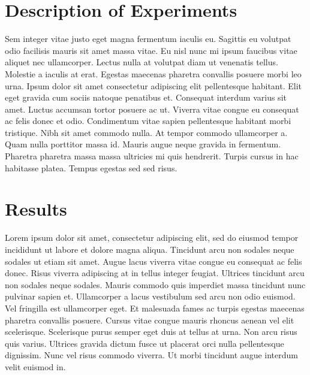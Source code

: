 \documentclass[
]{article}
\begin{document}
\hypertarget{description-of-experiments}{%
\section{Description of Experiments}\label{description-of-experiments}}

Sem integer vitae justo eget magna fermentum iaculis eu. Sagittis eu volutpat odio facilisis mauris sit amet massa vitae. Eu nisl nunc mi ipsum faucibus vitae aliquet nec ullamcorper. Lectus nulla at volutpat diam ut venenatis tellus. Molestie a iaculis at erat. Egestas maecenas pharetra convallis posuere morbi leo urna. Ipsum dolor sit amet consectetur adipiscing elit pellentesque habitant. Elit eget gravida cum sociis natoque penatibus et. Consequat interdum varius sit amet. Luctus accumsan tortor posuere ac ut. Viverra vitae congue eu consequat ac felis donec et odio. Condimentum vitae sapien pellentesque habitant morbi tristique. Nibh sit amet commodo nulla. At tempor commodo ullamcorper a. Quam nulla porttitor massa id. Mauris augue neque gravida in fermentum. Pharetra pharetra massa massa ultricies mi quis hendrerit. Turpis cursus in hac habitasse platea. Tempus egestas sed sed risus.

\hypertarget{results}{%
\section{Results}\label{results}}

Lorem ipsum dolor sit amet, consectetur adipiscing elit, sed do eiusmod tempor incididunt ut labore et dolore magna aliqua. Tincidunt arcu non sodales neque sodales ut etiam sit amet. Augue lacus viverra vitae congue eu consequat ac felis donec. Risus viverra adipiscing at in tellus integer feugiat. Ultrices tincidunt arcu non sodales neque sodales. Mauris commodo quis imperdiet massa tincidunt nunc pulvinar sapien et. Ullamcorper a lacus vestibulum sed arcu non odio euismod. Vel fringilla est ullamcorper eget. Et malesuada fames ac turpis egestas maecenas pharetra convallis posuere. Cursus vitae congue mauris rhoncus aenean vel elit scelerisque. Scelerisque purus semper eget duis at tellus at urna. Non arcu risus quis varius. Ultrices gravida dictum fusce ut placerat orci nulla pellentesque dignissim. Nunc vel risus commodo viverra. Ut morbi tincidunt augue interdum velit euismod in.
\end{document}
